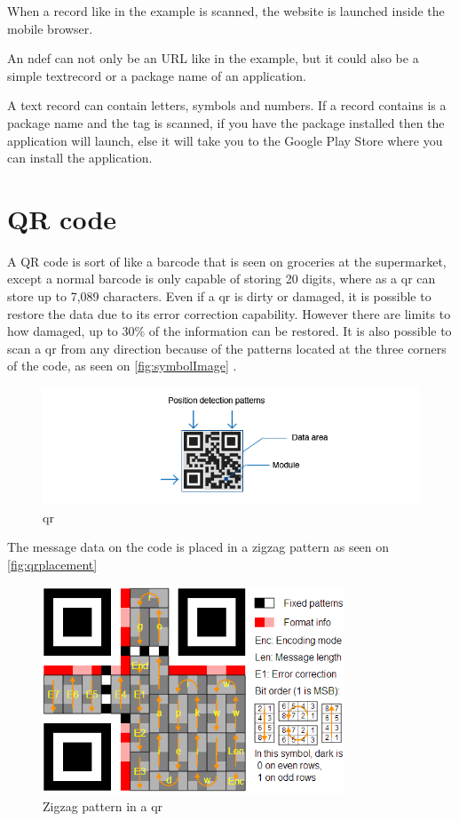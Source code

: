 When a record like in the example is scanned, the website is launched inside the mobile browser. 

An \ac{ndef} can not only be an URL like in the example, but it could also be a simple textrecord or a package name of an application. 

A text record can contain letters, symbols and numbers. If a record contains is a package name and the tag is scanned, if you have the package installed then the application will launch, else it will take you to the Google Play Store where you can install the application. 

\section{QR code}

A QR code is sort of like a barcode that is seen on groceries at the supermarket, except a normal barcode is only capable of storing 20 digits, where as a \ac{qr} can store up to 7,089 characters. Even if a \ac{qr} is dirty or damaged, it is possible to restore the data due to its error correction capability. However there are limits to how damaged, up to 30\% of the information can be restored. It is also possible to scan a \ac{qr} from any direction  because of the patterns located at the three corners of the code, as seen on \autoref{fig:symbolImage} \citep{qrcode}.

\begin{figure}[H]
\centering
\includegraphics[width=1.5\textwidth]{img/symbolImage.png}
\caption{\ac{qr}\citep{qrcode}}
\label{fig:symbolImage}
\end{figure}

The message data on the code is placed in a zigzag pattern as seen on \autoref{fig:qrplacement} 

\begin{figure}[H]
\centering
\includegraphics[width=0.8\textwidth]{img/qrplacement.png}
\caption{Zigzag pattern in a \ac{qr}\citep{qrcode1}}
\label{fig:qrplacement}
\end{figure}

